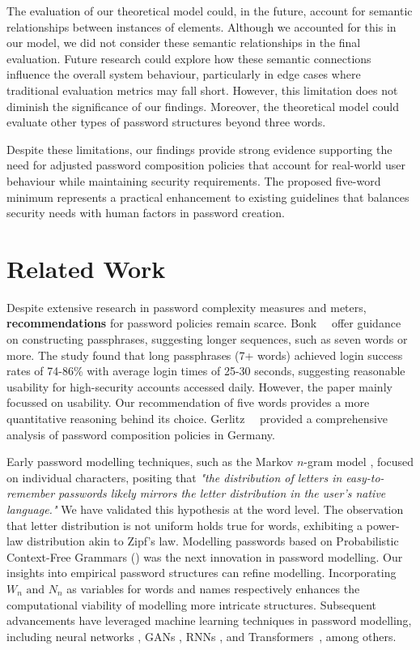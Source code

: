 The evaluation of our theoretical model could, in the future, account for semantic relationships between instances of elements. Although we accounted for this in our model, we did not consider these semantic relationships in the final evaluation. Future research could explore how these semantic connections influence the overall system behaviour, particularly in edge cases where traditional evaluation metrics may fall short. However, this limitation does not diminish the significance of our findings. Moreover, the theoretical model could evaluate other types of password structures beyond three words.

Despite these limitations, our findings provide strong evidence supporting the need for adjusted password composition policies that account for real-world user behaviour while maintaining security requirements. The proposed five-word minimum represents a practical enhancement to existing guidelines that balances security needs with human factors in password creation.
    
\section{Related Work}

Despite extensive research in password complexity measures and meters, \textbf{recommendations} for password policies remain scarce. Bonk~\etal~\cite{Bonk_Parish_et_al_2021} offer guidance on constructing passphrases, suggesting longer sequences, such as seven words or more. The study found that long passphrases (7+ words) achieved login success rates of 74-86\% with average login times of 25-30 seconds, suggesting reasonable usability for high-security accounts accessed daily. However, the paper mainly focussed on usability. Our recommendation of five words provides a more quantitative reasoning behind its choice. Gerlitz~\etal~\cite{gerlitz_please_2021} provided a comprehensive analysis of password composition policies in Germany.

Early password modelling techniques, such as the Markov $n$-gram model \cite{Narayanan_Shmatikov_2005}, focused on individual characters, positing that \textit{"the distribution of letters in easy-to-remember passwords likely mirrors the letter distribution in the user's native language."} We have validated this hypothesis at the word level. The observation that letter distribution is not uniform holds true for words, exhibiting a power-law distribution akin to Zipf's law. Modelling passwords based on Probabilistic Context-Free Grammars (\pcfg) was the next innovation in password modelling. Our insights into empirical password structures can refine \pcfgnocite modelling. Incorporating $W_n \text{ and } N_n$ as variables for words and names respectively enhances the computational viability of modelling more intricate structures. Subsequent advancements have leveraged machine learning techniques in password modelling, including neural networks \cite{Castro2017ModelingPG}, GANs \cite{Hitaj_Gasti_Ateniese_Perez-Cruz_2019}, RNNs \cite{Melicher_Ur_Segreti_Komanduri_Bauer_Christin_Cranor_2016}, and Transformers~\cite{Xu_Yu_Zhang_Wang_Zhang_Wu_Han_2023}, among others.


